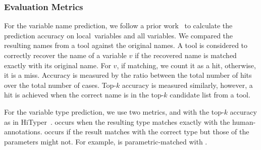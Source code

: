 \subsubsection*{Evaluation Metrics}

For the variable name prediction, we follow a prior work~\cite{icse19}
to calculate the prediction accuracy on local~variables and all
variables. We compared the resulting names from a tool against the
original names. A tool is considered to correctly
recover the name of a variable $v$ if the recovered name is
matched exactly with its original name. For $v$, if matching, we count
it as a hit, otherwise, it is a miss. Accuracy is measured by the
ratio between the total number of hits over the total number of
cases. Top-$k$ accuracy is measured similarly, however, a hit is
achieved when the correct name is in the top-$k$ candidate list from a
tool.

For the variable type prediction, we use two metrics,
 and  with the top-$k$
accuracy as in HiTyper~\cite{HiTyper-icse22}. 
occurs when the resulting type matches exactly with the
human-annotations.  occurs if the result
matches with the correct type but those of the parameters might
not. For example,  is 
parametric-matched with .


